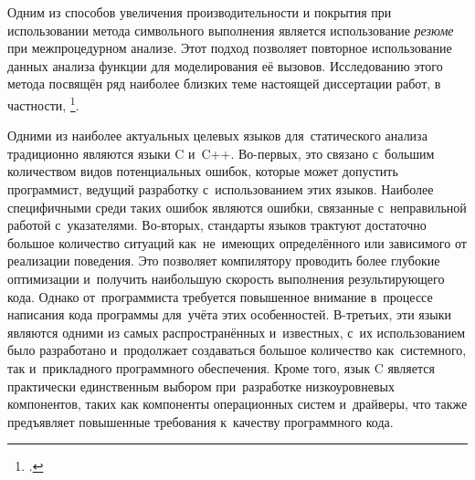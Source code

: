 Одним из способов увеличения производительности и покрытия при использовании метода символьного выполнения является использование \textit{резюме} при межпроцедурном анализе. Этот подход позволяет повторное использование данных анализа функции для моделирования её вызовов. Исследованию этого метода посвящён ряд наиболее близких теме настоящей диссертации работ, в частности, \footcite{godefroid-comp,anand-godefroid,may-must}.

Одними из наиболее актуальных целевых языков для~статического анализа традиционно являются языки C и~C++. Во-первых, это связано с~большим количеством видов потенциальных ошибок, которые может допустить программист, ведущий разработку с~использованием этих языков. Наиболее специфичными среди таких ошибок являются ошибки, связанные с~неправильной работой с~указателями. Во-вторых, стандарты языков трактуют достаточно большое количество ситуаций как~не~имеющих определённого или зависимого от реализации поведения. Это позволяет компилятору проводить более глубокие оптимизации и~получить наибольшую скорость выполнения результирующего кода. Однако от~программиста требуется повышенное внимание в~процессе написания кода программы для~учёта этих особенностей. В-третьих, эти языки являются одними из самых распространённых и~известных, с~их использованием было разработано и~продолжает создаваться большое количество как~системного, так и~прикладного программного обеспечения. Кроме того, язык C является практически единственным выбором при~разработке низкоуровневых компонентов, таких как компоненты операционных систем и~драйверы, что также предъявляет повышенные требования к~качеству программного кода.


